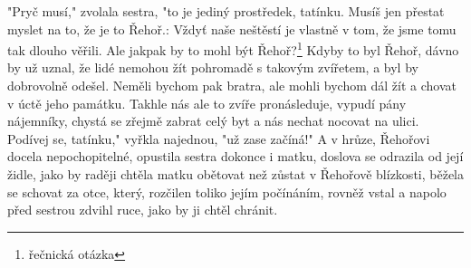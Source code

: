 \documentclass[10pt,a4paper]{article}
\begin{document}
"Pryč musí," zvolala sestra, "to je jediný prostředek, tatínku. Musíš jen přestat myslet na to, že je to Řehoř.: Vždyť naše neštěstí je vlastně v tom, že jsme tomu tak dlouho věřili. Ale jakpak by to mohl být Řehoř?\footnote{řečnická otázka} Kdyby to byl Řehoř, dávno by už uznal, že lidé nemohou žít pohromadě s takovým zvířetem, a byl by dobrovolně odešel. Neměli bychom pak bratra, ale mohli bychom dál žít a chovat v úctě jeho památku. Takhle nás ale to zvíře pronásleduje, vypudí pány nájemníky, chystá se zřejmě zabrat celý byt a nás nechat nocovat na ulici. Podívej se, tatínku," vyřkla najednou, "už zase začíná!" A v hrůze, Řehořovi docela nepochopitelné, opustila sestra dokonce i matku, doslova se odrazila od její židle, jako by raději chtěla matku obětovat než zůstat v Řehořově blízkosti, běžela se schovat za otce, který, rozčilen toliko jejím počínáním, rovněž vstal a napolo před sestrou zdvihl ruce, jako by ji chtěl chránit.

\newpage
\end{document}
